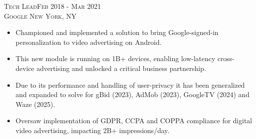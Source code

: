   
\textsc{Tech Lead\hfill Feb 2018 - Mar 2021\\}
\textsc{Google \hfill New York, NY\\}
\begin{itemize}
	\setlength{\itemsep}{1pt}
	\setlength{\parskip}{0pt}
	\setlength{\parsep}{0pt}
	\setlength{\leftmargin}{-5mm}
  \item Championed and implemented a solution to bring Google-signed-in personalization to video advertising on Android.

  \item This new module is running on 1B+ devices, enabling low-latency cross-device advertising and unlocked a critical business partnership.
 
  \item Due to its performance and handling of user-privacy it has been generalized and expanded to solve for gBid (2023), AdMob (2023), GoogleTV (2024) and Waze (2025).

  \item Oversaw implementation of GDPR, CCPA and COPPA compliance for digital video advertising, impacting 2B+ impressions/day.







\end{itemize}

